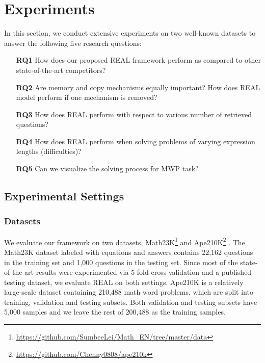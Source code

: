 \documentclass[11pt, a4paper]{article}
\begin{document}
\section{Experiments}
In this section, we conduct extensive experiments on two well-known datasets to answer the following five research questions:
\begin{itemize}
	\item [\textbf{RQ1}] How does our proposed REAL framework perform as compared to other state-of-the-art competitors?
	\item [\textbf{RQ2}] Are memory and copy mechanisms equally important? How does REAL model perform if one mechanism is removed?
	\item [\textbf{RQ3}] How does REAL perform with respect to various number of retrieved questions?
	\item [\textbf{RQ4}] How does REAL perform when solving problems of varying expression lengths (difficulties)?
	\item [\textbf{RQ5}] Can we visualize the solving process for MWP task?
\end{itemize}

\subsection{Experimental Settings}
\subsubsection{Datasets}
We evaluate our framework on two datasets, Math23K\footnote{\url{https://github.com/SumbeeLei/Math_EN/tree/master/data}} \cite{wang2017deep} and Ape210K\footnote{\url{https://github.com/Chenny0808/ape210k}} \cite{zhao2020ape210k}. The Math23K dataset labeled with equations and answers contains 22,162 questions in the training set and 1,000 questions in the testing set.
Since most of the state-of-the-art results were experimented via 5-fold cross-validation and a published testing dataset, we evaluate REAL on both settings. 
Ape210K is a relatively large-scale dataset containing 210,488 math word problems, which are split into training, validation and testing subsets. Both validation and testing subsets have 5,000 samples and we leave the rest of 200,488 as the training samples. 
\end{document}
